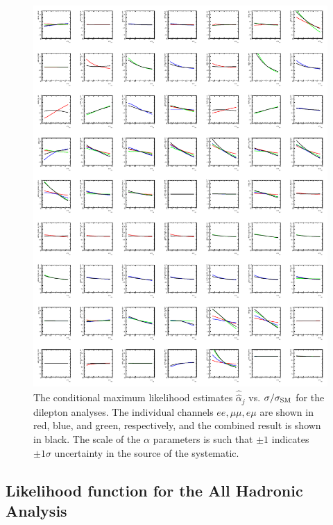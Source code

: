  \begin{figure}[htbp]
   \begin{center}
     \includegraphics[width=\textwidth]{figures/comb/DilepProfilePlots}
    \caption{The conditional maximum likelihood estimates $\hat{\hat{\alpha}}_j$ vs. $\sigma/\sigma_{\rm SM}$ for the dilepton analyses.  The individual channels $ee, \mu\mu, e\mu$ are shown in red, blue, and green, respectively, and the combined result is shown in black.  The scale of the $\alpha$ parameters is such that $\pm 1$ indicates $\pm 1\sigma$ uncertainty in the source of the systematic.}
     \label{fig:dilepton_profile}
   \end{center}
 \end{figure}


\subsection{Likelihood function for the All Hadronic Analysis}
\label{sec:allhad}

